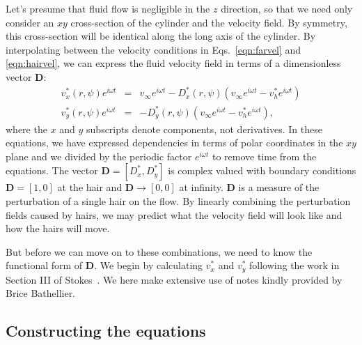 \documentclass[11pt]{amsart}
\newcommand{\vinf}{v_{\infty}}
\newcommand{\om}{\omega}
\newcommand{\bD}{\mathbf{D}}
\newcommand{\baa}[1]{\begin{eqnarray} #1 \end{eqnarray}}
\begin{document}
Let's presume that fluid flow is negligible in the $z$ direction, so that we need only consider an $xy$ cross-section of the cylinder and the velocity field. By symmetry, this cross-section will be identical along the long axis of the cylinder. By interpolating between the velocity conditions in Eqs.~\eqref{eqn:farvel} and \eqref{eqn:hairvel}, we can express the fluid velocity field in terms of a dimensionless vector $\bD$:
\baa{
v_x^*(r,\psi)e^{i\om t} &=& \vinf e^{i\om t} - D_x^*(r,\psi)(\vinf e^{i\om t} - v_h^* e^{i\om t}) \nonumber \\
v_y^*(r,\psi)e^{i\om t} &=& - D_y^*(r,\psi)(\vinf e^{i\om t} - v_h^*e^{i\om t}), \label{eqn:interp}
}
where the $x$ and $y$ subscripts denote components, not derivatives. In these equations, we have expressed dependencies in terms of polar coordinates in the $xy$ plane and we divided by the periodic factor $e^{i \om t}$ to remove time from the equations. The vector $\bD=[D_x^*,D_y^*]$ is complex valued with boundary conditions $\bD = [1,0]$ at the hair and $\bD \to [0,0]$ at infinity. $\bD$ is a measure of the perturbation of a single hair on the flow. By linearly combining the perturbation fields caused by hairs, we may predict what the velocity field will look like and how the hairs will move.  

But before we can move on to these combinations, we need to know the functional form of $\bD$. We begin by calculating $v_x^*$ and $v_y^*$ following the work in Section III of Stokes~\cite{stokes}. We here make extensive use of notes kindly provided by Brice Bathellier.
	
\subsection{Constructing the equations}
\end{document}
